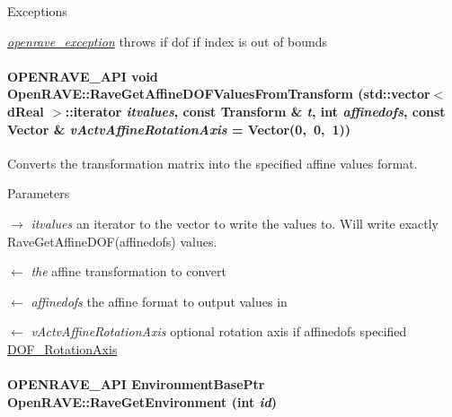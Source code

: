 \begin{DoxyExceptions}{Exceptions}
\item[{\em \hyperlink{classOpenRAVE_1_1openrave__exception}{openrave\_\-exception}}]throws if dof if index is out of bounds \end{DoxyExceptions}
\hypertarget{namespaceOpenRAVE_a66055231535a166b71d8815e8d2a73a7}{
\paragraph[{RaveGetAffineDOFValuesFromTransform}]{\setlength{\rightskip}{0pt plus 5cm}OPENRAVE\_\-API void OpenRAVE::RaveGetAffineDOFValuesFromTransform (std::vector$<$ dReal $>$::iterator {\em itvalues}, \/  const Transform \& {\em t}, \/  int {\em affinedofs}, \/  const Vector \& {\em vActvAffineRotationAxis} = {\ttfamily Vector(0,~0,~1)})}\hfill}
\label{namespaceOpenRAVE_a66055231535a166b71d8815e8d2a73a7}


Converts the transformation matrix into the specified affine values format. 


\begin{DoxyParams}{Parameters}
\item[\mbox{$\rightarrow$} {\em itvalues}]an iterator to the vector to write the values to. Will write exactly RaveGetAffineDOF(affinedofs) values. \item[\mbox{$\leftarrow$} {\em the}]affine transformation to convert \item[\mbox{$\leftarrow$} {\em affinedofs}]the affine format to output values in \item[\mbox{$\leftarrow$} {\em vActvAffineRotationAxis}]optional rotation axis if affinedofs specified \hyperlink{namespaceOpenRAVE_a3016e2185103f3c1bdc5e4482893ca98a5ee6baa8acb92c310cbc1ece082640d0}{DOF\_\-RotationAxis} \end{DoxyParams}
\hypertarget{namespaceOpenRAVE_aabe395213e4bac04e7d74e4a9fb73773}{
\paragraph[{RaveGetEnvironment}]{\setlength{\rightskip}{0pt plus 5cm}OPENRAVE\_\-API EnvironmentBasePtr OpenRAVE::RaveGetEnvironment (int {\em id})}\hfill}
\label{namespaceOpenRAVE_aabe395213e4bac04e7d74e4a9fb73773}


